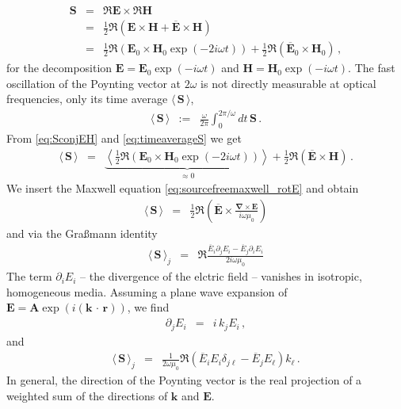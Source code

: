\documentclass[12pt,a4paper,twoside,openright,BCOR10mm,headsepline,titlepage,abstracton,chapterprefix,final]{scrreprt}
\newcommand\Vector[1]{{\mathbf{#1}}}
\newcommand\vacuum{0}
\newcommand\Location{\Vector{r}}
\newcommand\wavenumber{k}
\newcommand\Wavevector{\Vector{\wavenumber}}
\newcommand\Nabla{\Vector{\nabla}}
\newcommand{\scpm}[2]{(#1\,\cdot\,#2)}
\newcommand\scalarEfield{E}
\newcommand\scalarHfield{H}
\newcommand\Efield{\Vector{\scalarEfield}}
\newcommand\Hfield{\Vector{\scalarHfield}}
\newcommand\vacuumpermeability{\scalarpermeability_{\vacuum}}
\newcommand\scalarpermeability{\mu}
\newcommand{\timeavg}[1]{{\langle\,#1\,\rangle}}
\begin{document}
\begin{eqnarray}
 \Vector{S} &=& \Re \Efield \times \Re \Hfield \nonumber \\
            &=& \frac{1}{2} \Re ( \Efield \times \Hfield + \overline{\Efield} \times \Hfield ) \nonumber \\
            &=& \frac{1}{2} \Re ( \Efield_0 \times \Hfield_0 \exp(-2i\omega t) )
	      + \frac{1}{2} \Re ( \overline{\Efield}_0 \times \Hfield_0 ) \label{eq:SconjEH}\,,
\end{eqnarray}
for the decomposition $\Efield = \Efield_0 \exp(-i\omega t)$ and $\Hfield = \Hfield_0 \exp(-i\omega t)$.
The fast oscillation of the Poynting vector at $2 \omega$ is not directly measurable at optical frequencies, only its time average $\timeavg{\Vector{S}}$,
\begin{eqnarray}
 \timeavg{\Vector{S}}  &:=& \frac{\omega}{2\pi} \int_{0}^{2\pi / \omega} dt \, \Vector{S} \label{eq:timeaverageS}\,.
\end{eqnarray}
From \eqref{eq:SconjEH} and \eqref{eq:timeaverageS} we get
\begin{eqnarray}
  \timeavg{\Vector{S}}   &=& \underbrace{\left\langle \frac{1}{2} \Re ( \Efield_0 \times \Hfield_0 \exp(-2i\omega t) )\right\rangle}_{\approx0} + \frac{1}{2} \Re ( \overline{\Efield} \times \Hfield )\,.
\end{eqnarray}
We insert the Maxwell equation \eqref{eq:sourcefreemaxwell_rotE} and obtain
\begin{eqnarray}
 \timeavg{\Vector{S}}   &=& \frac{1}{2} \Re \left( \overline{\Efield} \times \frac{\Nabla \times \Efield}{i \omega \vacuumpermeability} \right)
\end{eqnarray}
and via the Gra\ss mann identity 
\begin{eqnarray}
  \timeavg{\Vector{S}}_j &=&  \Re \frac{ \overline{\scalarEfield}_i \partial_j \scalarEfield_i - \overline{\scalarEfield}_j \partial_i \scalarEfield_i }{2 i \omega \vacuumpermeability}
\end{eqnarray}
The term $\partial_i \scalarEfield_i$ -- the divergence of the elctric field -- vanishes in isotropic, homogeneous media.
Assuming a plane wave expansion of $\Efield = \Vector{A} \exp(i \scpm{\Vector{k}}{\Location})$, we find
\begin{eqnarray}
  \partial_j E_i &=& i\,k_j E_i\,,
\end{eqnarray}
and
\begin{eqnarray}
 \timeavg{\Vector{S}}_j &=&  
    \frac{1}{2 \omega \vacuumpermeability}\Re( 
	\overline{\scalarEfield}_i \scalarEfield_i \delta_{j\ell}  
	- \overline{\scalarEfield}_j \scalarEfield_\ell 
      ) k_\ell\,.\label{eq:poyntingvector}
\end{eqnarray}
In general, the direction of the Poynting vector is the real projection of a weighted sum of the directions of $\Wavevector$ and $\Efield$.
\end{document}
